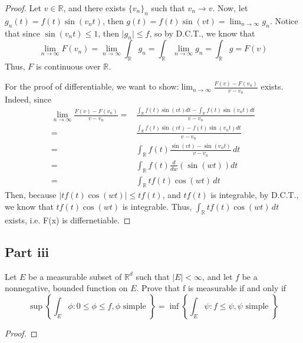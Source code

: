 \begin{answer}
    \begin{proof}
        Let $v \in \mathbb{R}$, and there exists $\{v_n\}_n$ such that $v_n \to v$. Now, let $g_n(t) = f(t)\sin(v_nt)$, then $g(t) = f(t)\sin(vt) = \lim_{n \to \infty} g_n$. Notice that since $\sin(v_nt) \leq 1$, then $\lvert g_n \rvert \leq f$, so by D.C.T., we know that
        \begin{equation}
            \lim_{n\to \infty} F(v_n) = \lim_{n\to\infty}\int_{\mathbb{R}} g_n = \int_{\mathbb{R}} \lim_{n\to \infty} g_n = \int_{\mathbb{R}} g = F(v)
        \end{equation}
        Thus, $F$ is continuous over $\mathbb{R}$.
        
        For the proof of differentiable, we want to show:$\lim_{n \to \infty} \tfrac{F(v) - F(v_n)}{v - v_n}$ exists. Indeed, since
        \begin{equation}
            \begin{aligned}
                    \lim_{n \to \infty} \tfrac{F(v) - F(v_n)}{v - v_n} =& \tfrac{\int_{\mathbb{R}} f(t) \sin (v t) d t - \int_{\mathbb{R}} f(t) \sin (v_n t) d t}{v - v_n}\\
                    =& \tfrac{\int_{\mathbb{R}} f(t) \sin (v t) - f(t) \sin (v_n t)d t}{v - v_n}\\
                    =& \int_{\mathbb{R}} f(t) \tfrac{\sin(vt) - \sin(v_nt)}{v - v_n} \,dt\\
                    =& \int_{\mathbb{R}} f(t) \tfrac{d}{dw} \left(\sin(wt)\right) dt\\
                    =& \int_{\mathbb{R}} tf(t) \cos(wt) \,dt
            \end{aligned}
        \end{equation}
        Then, because $\lvert tf(t)\cos(wt)\rvert \leq tf(t)$, and $tf(t)$ is integrable, by D.C.T., we know that $tf(t)\cos(wt)$ is integrable. Thus, $\int_{\mathbb{R}} tf(t) \cos(wt) \,dt$ exists, i.e. F(x) is differnetiable.
    \end{proof}
\end{answer}

\subsection{Part iii}

\begin{question}
   Let $E$ be a measurable subset of $\mathbb{R}^d$ such that $|E|<\infty$, and let $f$ be a nonnegative, bounded function on $E$. Prove that $\mathrm{f}$ is measurable if and only if
    $$
    \sup \left\{\int_E \phi: 0 \leq \phi \leq f, \phi \text { simple }\right\}=\inf \left\{\int_E \psi: f \leq \psi, \psi \text { simple }\right\}
    $$
\end{question}

\begin{answer}
   \begin{proof}
            
   \end{proof}
\end{answer}